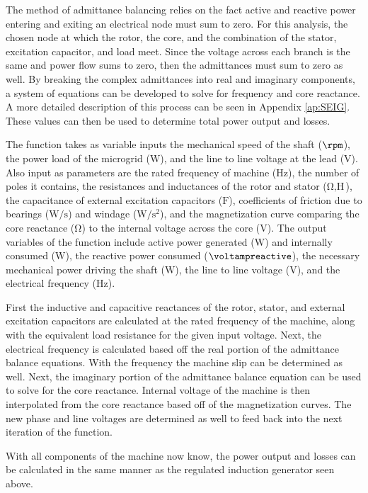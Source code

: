 The method of admittance balancing relies on the fact active and reactive power entering and exiting an electrical node must sum to zero. For this analysis, the chosen node at which the rotor, the core, and the combination of the stator, excitation capacitor, and load meet. Since the voltage across each branch is the same and power flow sums to zero, then the admittances must sum to zero as well. By breaking the complex admittances into real and imaginary components, a system of equations can be developed to solve for frequency and core reactance. A more detailed description of this process can be seen in Appendix \autoref{ap:SEIG}. These values can then be used to determine total power output and losses. 

The function takes as variable inputs the mechanical speed of the shaft ($\si{\rpm}$), the power load of the microgrid ($\si{\watt}$), and the line to line voltage at the lead ($\si{\volt}$). Also input as parameters are the rated frequency of machine ($\si{\hertz}$), the number of poles it contains, the resistances and inductances of the rotor and stator ($\si{\ohm}, \si{\henry}$), the capacitance of external excitation capacitors ($\si{\farad}$), coefficients of friction due to bearings ($\si{\watt\per\second}$) and windage ($\si{\watt\per\second\squared}$), and the magnetization curve comparing the core reactance ($\si{\ohm}$) to the internal voltage across the core ($\si{\volt}$). The output variables of the function include active power generated ($\si{\watt}$) and internally consumed ($\si{\watt}$), the reactive power consumed ($\si{\voltampreactive}$), the necessary mechanical power driving the shaft ($\si{\watt}$), the line to line voltage ($\si{\volt}$), and the electrical frequency ($\si{\hertz}$).

First the inductive and capacitive reactances of the rotor, stator, and external excitation capacitors are calculated at the rated frequency of the machine, along with the equivalent load resistance for the given input voltage. Next, the electrical frequency is calculated based off the real portion of the admittance balance equations. With the frequency the machine slip can be determined as well. Next, the imaginary portion of the admittance balance equation can be used to solve for the core reactance. Internal voltage of the machine is then interpolated from the core reactance based off of the magnetization curves. The new phase and line voltages are determined as well to feed back into the next iteration of the function.

With all components of the machine now know, the power output and losses can be calculated in the same manner as the regulated induction generator seen above. 

